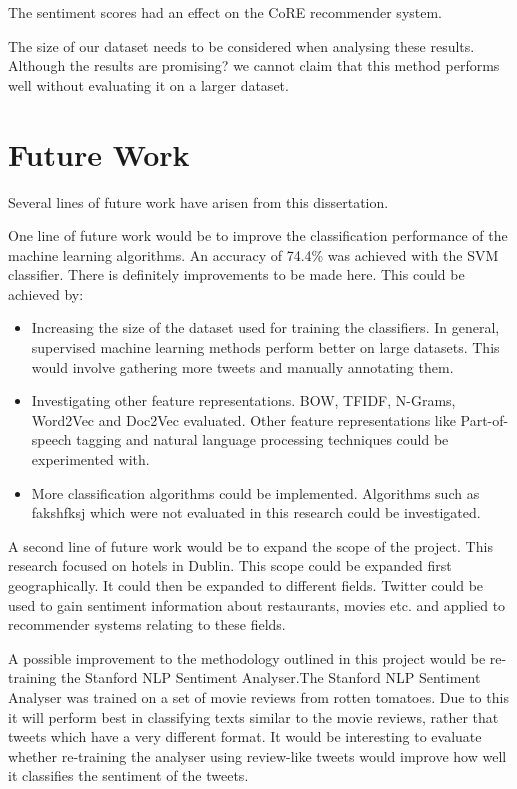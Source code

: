 The sentiment scores had an effect on the CoRE recommender system.

The size of our dataset needs to be considered when analysing these results. Although the results are promising? we cannot claim that this method performs well without evaluating it on a larger dataset. 


\section{Future Work}

Several lines of future work have arisen from this dissertation.

One line of future work would be to improve the classification performance of the machine learning algorithms. An accuracy of 74.4\% was achieved with the SVM classifier. There is definitely improvements to be made here. This could be achieved by:
\begin{itemize}
    \item Increasing the size of the dataset used for training the classifiers. In general, supervised machine learning methods perform better on large datasets. This would involve gathering more tweets and manually annotating them.
    \item Investigating other feature representations. BOW, TFIDF, N-Grams, Word2Vec and Doc2Vec evaluated. Other feature representations like Part-of-speech tagging and natural language processing techniques could be experimented with.
    \item More classification algorithms could be implemented. Algorithms such as fakshfksj which were not evaluated in this research could be investigated. 
\end{itemize}

A second line of future work would be to expand the scope of the project. This research focused on hotels in Dublin. This scope could be expanded first geographically. It could then be expanded to different fields. Twitter could be used to gain sentiment information about restaurants, movies etc. and applied to recommender systems relating to these fields.

A possible improvement to the methodology outlined in this project would be re-training the Stanford NLP Sentiment Analyser.The Stanford NLP Sentiment Analyser was trained on a set of movie reviews from rotten tomatoes. Due to this it will perform best in classifying texts similar to the movie reviews, rather that tweets which have a very different format. It would be interesting to evaluate whether re-training the analyser using review-like tweets would improve how well it classifies the sentiment of the tweets. 


